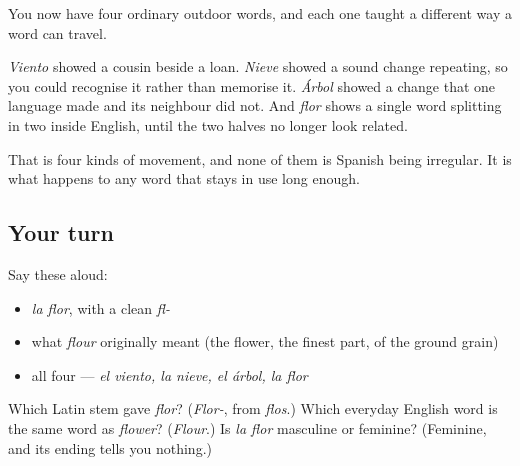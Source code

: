 \begin{grammarlens}[title={What you've built}]
You now have four ordinary outdoor words, and each one taught a different way a word can travel.

\emph{Viento} showed a cousin beside a loan. \emph{Nieve} showed a sound change repeating, so you could recognise it rather than memorise it. \emph{Árbol} showed a change that one language made and its neighbour did not. And \emph{flor} shows a single word splitting in two inside English, until the two halves no longer look related.

That is four kinds of movement, and none of them is Spanish being irregular. It is what happens to any word that stays in use long enough.
\end{grammarlens}

\subsection*{Your turn}
Say these aloud:

\begin{itemize}
\raggedright
  \item \emph{la flor}, with a clean \emph{fl-}
  \item what \emph{flour} originally meant (the flower, the finest part, of the ground grain)
  \item all four — \emph{el viento, la nieve, el árbol, la flor}
\end{itemize}

\begin{tcolorbox}[breakable,colback=teal!4,colframe=teal!35!black,title={Before you move on}]
Which Latin stem gave \emph{flor}? (\emph{Flor-}, from \emph{flos}.) Which everyday English word is the same word as \emph{flower}? (\emph{Flour}.) Is \emph{la flor} masculine or feminine? (Feminine, and its ending tells you nothing.)
\end{tcolorbox}
